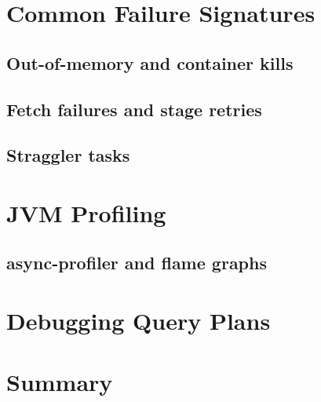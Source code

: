 \section{Common Failure Signatures}
\label{sec:dbg-failures}

\subsection{Out-of-memory and container kills}
\tbd

\subsection{Fetch failures and stage retries}
\tbd

\subsection{Straggler tasks}
\tbd

\section{JVM Profiling}
\label{sec:dbg-profiling}

\subsection{async-profiler and flame graphs}
\tbd

\section{Debugging Query Plans}
\label{sec:dbg-plans}
\tbd

\section{Summary}
\tbd
